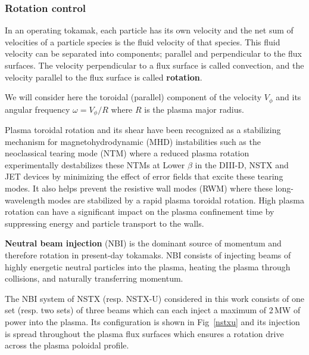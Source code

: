 \documentclass[12pt,lot, lof]{puthesis}
\begin{document}
\subsubsection{{Rotation control}} 

In an operating tokamak, each particle has its own velocity and the net sum of velocities of a particle species is the fluid velocity of that species. This fluid velocity can be separated into components; parallel and perpendicular to the flux surfaces. The velocity perpendicular to a flux surface is called convection, and the velocity parallel to the flux surface is called \textbf{rotation}.

We will consider here the toroidal (parallel) component of the velocity $V_{\phi}$ and its angular frequency $\omega = V_{\phi} / R$ where $R$ is the plasma major radius.

Plasma toroidal rotation and its shear have been recognized as a stabilizing mechanism for magnetohydrodynamic (MHD) instabilities such as the neoclassical tearing mode (NTM) \cite{LaHaye10} where a reduced plasma rotation experimentally destabilizes these NTMs at Lower $\beta$ in the DIII-D, NSTX and JET devices by minimizing the effect of error fields that excite these tearing modes. It also helps prevent the resistive wall modes (RWM) \cite{Garofalo02} where these long-wavelength modes are stabilized by a rapid plasma toroidal rotation.
High plasma rotation can have a significant impact on the plasma confinement time by suppressing energy and particle transport to the walls.

\textbf{Neutral beam injection} (NBI) is the dominant source of momentum and therefore rotation in present-day tokamaks. NBI consists of injecting beams of highly energetic neutral particles into the plasma, heating the plasma through collisions, and naturally transferring momentum. 


The NBI system of NSTX (resp. NSTX-U) considered in this work consists of one set (resp. two sets) of three beams which can each inject a maximum of 2\,MW of power into the plasma. Its configuration is shown in Fig~\ref{nstxu} and its injection is spread throughout the plasma flux surfaces which ensures a rotation drive across the plasma poloidal profile. 
\end{document}
